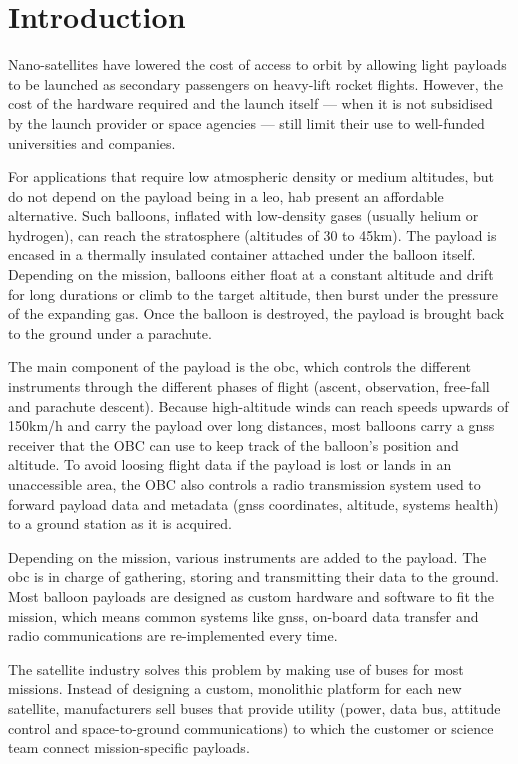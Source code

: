 \chapter{Introduction}
\label{ch:introduction}

Nano-satellites have lowered the cost of access to orbit by allowing light payloads to be launched as secondary passengers on heavy-lift rocket flights. However, the cost of the hardware required and the launch itself — when it is not subsidised by the launch provider or space agencies — still limit their use  to well-funded universities and companies.

For applications that require low atmospheric density or medium altitudes, but do not depend on the payload being in a \acrfull{leo}, \acrfull{hab} present an affordable alternative. Such balloons, inflated with low-density gases (usually helium or hydrogen), can reach the stratosphere (altitudes of 30 to 45km). The payload is encased in a thermally insulated container attached under the balloon itself. Depending on the mission, balloons either float at a constant altitude and drift for long durations or climb to the target altitude, then burst under the pressure of the expanding gas. Once the balloon is destroyed, the payload is brought back to the ground under a parachute.

The main component of the payload is the \acrfull{obc}, which controls the different instruments through the different phases of flight (ascent, observation, free-fall and parachute descent). Because high-altitude winds can reach speeds upwards of 150km/h and carry the payload over long distances, most balloons carry a \acrfull{gnss} receiver that the OBC can use to keep track of the balloon's position and altitude. To avoid loosing flight data if the payload is lost or lands in an unaccessible area, the OBC also controls a radio transmission system used to forward payload data and metadata (\acrshort{gnss} coordinates, altitude, systems health) to a ground station as it is acquired.

Depending on the mission, various instruments are added to the payload. The \acrshort{obc} is in charge of gathering, storing and transmitting their data to the ground. Most balloon payloads are designed as custom hardware and software to fit the mission, which means common systems like \acrshort{gnss}, on-board data transfer and radio communications are re-implemented every time.

The satellite industry solves this problem by making use of buses for most missions. Instead of designing a custom, monolithic platform for each new satellite, manufacturers sell buses that provide utility (power, data bus, attitude control and space-to-ground communications) to which the customer or science team connect mission-specific payloads.

